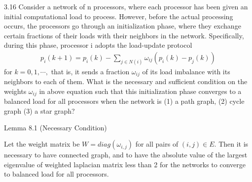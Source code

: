 \documentclass{article}
\begin{document}
\begin{problem} 3.16
    Consider a network of n processors, where each processor has been given an initial computational load to process. However, before the actual processing occurs, the processors go through an initialization phase, where they exchange certain fractions of their loads with their neighbors in the network. Speciﬁcally, during this phase, processor i adopts the load-update protocol 
    \begin{align*}
        p_i(k+1) = p_i(k) - \sum_{j \in N(i)} \omega_{ij}(p_i(k) - p_j(k))
    \end{align*}
    for $k = 0, 1, \cdots ,$ that is, it sends a fraction $\omega_{ij}$ of its load imbalance with its neighbors to each of them. What is the necessary and sufficient condition on the weights $\omega _{ij}$ in above equation such that this initialization phase converges to a balanced load for all processors when the network is (1) a path graph, (2) cycle graph (3) a star graph? 
    
    Lemma 8.1 (Necessary Condition)
    
    Let the weight matrix be $W = diag(\omega_{i,j})$ for all pairs of $(i,j) \in E$. Then it is necessary to have connected graph, and to have the absolute value of the largest eigenvalue of weighted laplacian matrix less than 2 for the networks to converge to balanced load for all processors. 


\end{problem}
\end{document}
